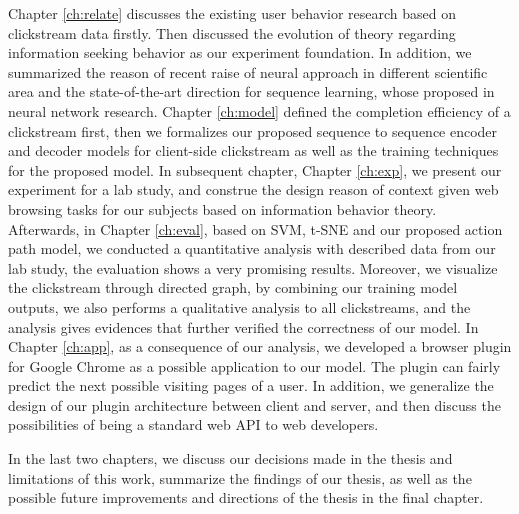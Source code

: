Chapter \ref{ch:relate} discusses the existing user behavior research based on clickstream data firstly. 
Then discussed the evolution of theory regarding information seeking behavior as our experiment foundation.
In addition, we summarized the reason of recent raise of neural approach in different scientific 
area and the state-of-the-art direction for sequence learning, whose proposed in neural network research.
Chapter \ref{ch:model} defined the completion efficiency of a clickstream first, then we
formalizes our proposed sequence to sequence encoder and decoder models for client-side
clickstream as well as the training techniques for the proposed model.
In subsequent chapter, Chapter \ref{ch:exp}, we present our experiment for a lab study,
and construe the design reason of context given web browsing tasks for our subjects based on information behavior theory.
Afterwards, in Chapter \ref{ch:eval}, based on SVM, t-SNE and our proposed action path model, 
we conducted a quantitative analysis with described data from our lab study, 
the evaluation shows a very promising results.
Moreover, we visualize the clickstream through directed graph, by combining our training model outputs,
we also performs a qualitative analysis to all clickstreams, and the analysis gives evidences that further 
verified the correctness of our model.
In Chapter \ref{ch:app}, as a consequence of our analysis, we developed a browser plugin 
for Google Chrome as a possible application to our model. The plugin can fairly predict 
the next possible visiting pages of a user. In addition, we generalize the design of
our plugin architecture between client and server,
and then discuss the possibilities of being a standard web API to web developers.

In the last two chapters, we discuss our decisions made in the thesis and limitations of this work, 
summarize the findings of our thesis, as well as the possible future improvements and 
directions of the thesis in the final chapter.
\cleardoublepage